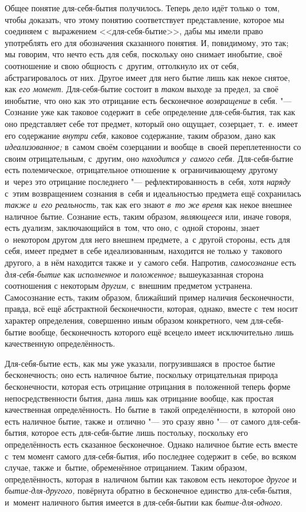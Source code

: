 Общее понятие для-себя-бытия получилось. Теперь дело идёт только о~том,
чтобы доказать, что этому понятию соответствует представление, которое мы
соединяем с~выражением <<для-себя-бытие>>, дабы мы имели право употреблять
его для обозначения сказанного понятия. И, повидимому, это так; мы говорим,
что нечто есть для себя, поскольку оно снимает инобытие, своё соотношение и
свою общность с~другим, оттолкнуло их от себя, абстрагировалось от них.
Другое имеет для него бытие лишь как некое снятое, как
{\em его момент}. Для-себя-бытие состоит в
{\em таком} выходе за предел, за своё инобытие, что оно
как это отрицание есть бесконечное {\em возвращение} в
себя. "--- Сознание уже как таковое содержит в~себе определение
для-себя-бытия, так как оно представляет себе тот предмет, который оно
ощущает, созерцает, т.~е. имеет его содержание
{\em внутри себя,} каковое содержание, таким образом,
дано как {\em идеализованное;} в~самом своём созерцании
и вообще в~своей переплетенности со своим отрицательным, с~другим, оно
{\em находится у~самого себя}. Для-себя-бытие есть
полемическое, отрицательное отношение к~ограничивающему другому и~через это
отрицание последнего "--- рефлектированность в~себя, хотя
{\em наряду} с~этим возвращением сознания в~себя и
идеальностью предмета ещё сохранилась {\em также и~его
реальность,} так как его знают {\em в~то же время} как
некое внешнее наличное бытие. Сознание есть, таким образом,
{\em являющееся} или, иначе говоря, есть дуализм,
заключающийся в~том, что оно, с~одной стороны, знает о~некотором другом для
него внешнем предмете, а~с другой стороны, есть для себя, имеет предмет в
себе идеализованным, находится не только у~такового другого, а~в нём
находится также и~у самого себя. Напротив, {\em самосознание} есть
{\em для-себя-бытие} как {\em исполненное} и
{\em положенное;} вышеуказанная сторона соотношения с
некоторым {\em другим,} с~внешним предметом устранена.
Самосознание есть, таким образом, ближайший пример наличия бесконечности,
правда, всё ещё абстрактной бесконечности, которая, однако, вместе с~тем
носит характер определения, совершенно иным образом конкретного, чем
для-себя-бытие вообще, бесконечность которого ещё всецело имеет
исключительно лишь качественную определённость.


Для-себя-бытие есть, как мы уже указали, погрузившаяся в~простое бытие
бесконечность; оно есть наличное бытие, поскольку отрицательная природа
бесконечности, которая есть отрицание отрицания в~положенной теперь форме
непосредственности бытия, дана лишь как отрицание вообще, как простая
качественная определённость. Но бытие в~такой определённости, в~которой оно
есть наличное бытие, также и~отлично "--- это сразу явно "--- от самого
для-себя-бытия, которое есть для-себя-бытие лишь постольку, поскольку его
определённость есть сказанное бесконечное. Однако наличное бытие есть
вместе с~тем момент самого для-себя-бытия, ибо последнее содержит в~себе,
во всяком случае, также и~бытие, обременённое отрицанием. Таким образом,
определённость, которая в~наличном бытии как таковом есть некоторое
{\em другое} и {\em бытие-для-другого,} повёрнута обратно в
бесконечное единство для-себя-бытия, и~момент наличного бытия имеется в
для-себя-бытии как {\em бытие-для-одного}.

